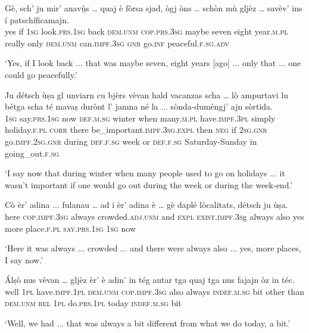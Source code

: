\begin{linenumbers}
	\gll Gè, sch’ ju mir’ anavù̱s … quaj è fòrsa sjad, ògj òns … schòn mù gljèz … savèv’ ins í patschíficamajn.   \\
	yes if \textsc{1sg} look.\textsc{prs.1sg} back {} \textsc{dem.unm} \textsc{cop.prs.3sg} maybe seven eight year.\textsc{m.pl} {} really only \textsc{dem.unm} {} can.\textsc{impf.3sg} \textsc{gnr} go.\textsc{inf} peaceful.\textsc{f.sg.adv}\\
\end{linenumbers}
\medskip
\glt `Yes, if I look back ... that was maybe seven, eight years [ago] ... only that ... one could go peacefully.'
\medskip

\begin{linenumbers}
	\gll Ju détsch ùṣa gl unviarn cu bjèrs vèvan hald vacanzas scha … lò ampurtavi lu bétga scha té mavaṣ durònt l’ jamna né la ... sònda-duméngj’ ajn sòrtida.   \\
	\textsc{1sg} say.\textsc{prs.1sg} now \textsc{def.m.sg} winter when many.\textsc{m.pl} have.\textsc{impf.3pl} simply holiday.\textsc{f.pl} \textsc{corr} {} there be\_important.\textsc{impf.3sg.expl} then \textsc{neg} if \textsc{2sg.gnr} go.\textsc{impf.2sg.gnr} during \textsc{def.f.sg} week or \textsc{def.f.sg} {} Saturday-Sunday in going\_out.\textsc{f.sg}\\
\end{linenumbers}
\medskip
\glt `I say now that during winter when many people used to go on holidays ... it wasn't important if one would go out during the week or during the week-end.'
\medskip

\begin{linenumbers}
	\gll  Cò èr’ adina ... fulanau … ad i èr’ adina è … gè daplé lòcalitats, détsch ju ùṣa.  \\
	here \textsc{cop.impf.3sg} always {} crowded.\textsc{adj.unm} {} and \textsc{expl} \textsc{exist.impf.3s}g always also {} yes more place.\textsc{f.pl} \textsc{say.prs.1sg} \textsc{1sg} now \\
\end{linenumbers}
\medskip
\glt `Here it was always ... crowded ... and there were always also ... yes, more places, I say now.'
\medskip

\begin{linenumbers}
	\gll  Álṣò nus vèvan … gljèz èr’ è adin’ in tég autar tga quaj tga nus fajajn òz in téc.  \\
	well \textsc{1pl} have.\textsc{impf.1pl} {} \textsc{dem.unm} \textsc{cop.impf.3sg} also always \textsc{indef.m.sg} bit other than \textsc{dem.unm} \textsc{rel} \textsc{1pl} do.\textsc{prs.1pl} today \textsc{indef.m.sg} bit\\
\end{linenumbers}
\medskip
\glt `Well, we had ... that was always a bit different from what we do today, a bit.'
\medskip


